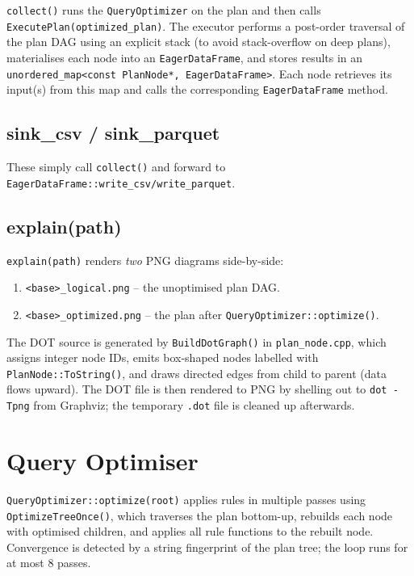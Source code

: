\documentclass[12pt,a4paper]{article}
\begin{document}
\texttt{collect()} runs the \texttt{QueryOptimizer} on the plan and then
calls \texttt{ExecutePlan(optimized\_plan)}.  The executor performs a
post-order traversal of the plan DAG using an explicit stack (to avoid
stack-overflow on deep plans), materialises each node into an
\texttt{EagerDataFrame}, and stores results in an
\texttt{unordered\_map<const PlanNode*, EagerDataFrame>}.  Each node
retrieves its input(s) from this map and calls the corresponding
\texttt{EagerDataFrame} method.

\subsection{sink\_csv / sink\_parquet}

These simply call \texttt{collect()} and forward to
\texttt{EagerDataFrame::write\_csv/write\_parquet}.

\subsection{explain(path)}

\texttt{explain(path)} renders \emph{two} PNG diagrams side-by-side:

\begin{enumerate}
  \item \texttt{<base>\_logical.png} -- the unoptimised plan DAG.
  \item \texttt{<base>\_optimized.png} -- the plan after
        \texttt{QueryOptimizer::optimize()}.
\end{enumerate}

The DOT source is generated by \texttt{BuildDotGraph()} in
\texttt{plan\_node.cpp}, which assigns integer node IDs, emits box-shaped
nodes labelled with \texttt{PlanNode::ToString()}, and draws directed
edges from child to parent (data flows upward).  The DOT file is then
rendered to PNG by shelling out to \texttt{dot -Tpng} from Graphviz; the
temporary \texttt{.dot} file is cleaned up afterwards.

\section{Query Optimiser}

\texttt{QueryOptimizer::optimize(root)} applies rules in multiple passes
using \texttt{OptimizeTreeOnce()}, which traverses the plan bottom-up,
rebuilds each node with optimised children, and applies all rule functions
to the rebuilt node.  Convergence is detected by a string fingerprint of
the plan tree; the loop runs for at most 8 passes.
\end{document}

